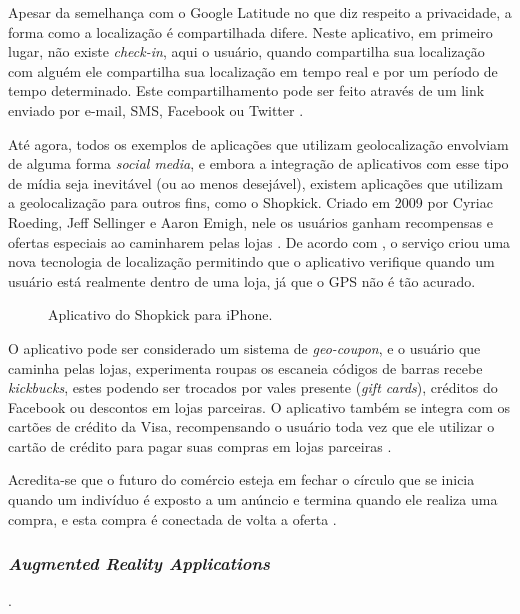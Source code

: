 \documentclass[diss]{template/setrem}
\begin{document}
Apesar da semelhança com o Google Latitude no que diz respeito a privacidade, a forma como a localização é compartilhada difere. Neste aplicativo, em primeiro lugar, não existe \emph{check-in}, aqui o usuário, quando compartilha sua localização com alguém ele compartilha sua localização em tempo real e por um período de tempo determinado. Este compartilhamento pode ser feito através de um link enviado por e-mail, SMS, Facebook ou Twitter \citep{AppleStore2012d, Holdener2011}.

Até agora, todos os exemplos de aplicações que utilizam geolocalização envolviam de alguma forma \emph{social media}, e embora a integração de aplicativos com esse tipo de mídia seja inevitável (ou ao menos desejável), existem aplicações que utilizam a geolocalização para outros fins, como o Shopkick. Criado em 2009 por Cyriac Roeding, Jeff Sellinger e Aaron Emigh, nele os usuários ganham recompensas e ofertas especiais ao caminharem pelas lojas \citep{Holdener2011}. De acordo com \citet{CrunchBase2012}, o serviço criou uma nova tecnologia de localização permitindo que o aplicativo verifique quando um usuário está realmente dentro de uma loja, já que o GPS não é tão acurado.

\begin{figure}[!h]
    \caption{Aplicativo do Shopkick para iPhone.}
    \label{fig:shopkick}
\end{figure}

O aplicativo pode ser considerado um sistema de \emph{geo-coupon}, e o usuário que caminha pelas lojas, experimenta roupas os escaneia códigos de barras recebe \emph{kickbucks}, estes podendo ser trocados por vales presente (\emph{gift cards}), créditos do Facebook ou descontos em lojas parceiras. O aplicativo também se integra com os cartões de crédito da Visa, recompensando o usuário toda vez que ele utilizar o cartão de crédito para pagar suas compras em lojas parceiras \citep{Rao2011}.

Acredita-se que o futuro do comércio esteja em fechar o círculo que se inicia quando um indivíduo é exposto a um anúncio e termina quando ele realiza uma compra, e esta compra é conectada de volta a oferta \citep{Rao2011}.

\subsubsection{\textit{Augmented Reality Applications}}
 \citep[p. 16]{Holdener2011}.
\end{document}
